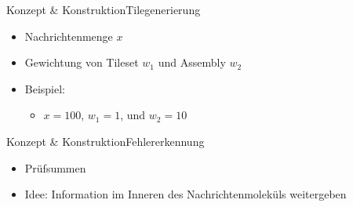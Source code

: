 \documentclass{beamer}
\begin{document}
\begin{frame}[t]{Konzept \& Konstruktion}{Tilegenerierung}
    \begin{itemize}
        \item Nachrichtenmenge $x$
        \item Gewichtung von Tileset $w_1$ und Assembly $w_2$ 
        \item Beispiel:
        \begin{itemize}
            \item $x = 100$, $w_1 = 1$, und $w_2 = 10$
        \end{itemize}
    \end{itemize}
    \vspace{0.5cm}
    \begin{figure}
        \centering
    \end{figure}
\end{frame}

\begin{frame}[t]{Konzept \& Konstruktion}{Fehlererkennung}
    \begin{itemize}
        \item Prüfsummen
        \item Idee: Information im Inneren des Nachrichtenmoleküls weitergeben
    \end{itemize}
    \vspace{1cm}
    \begin{figure}
        \centering
    \end{figure}
\end{frame}
\end{document}
